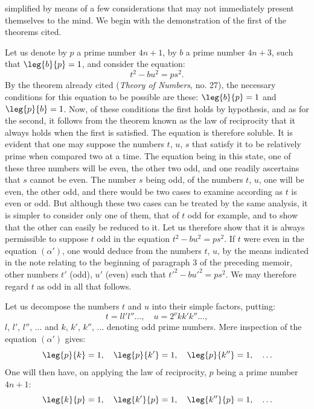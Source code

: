 \noindent
simplified by means of a few considerations that may not immediately
present themselves to the mind. We begin with the demonstration of the first
of the theorems cited.
\par\indent
Let us denote by $p$ a prime number $4n+1$, by $b$ a prime number
$4n+3$, such that $\leg{b}{p}=1$, and consider the equation:
\begin{equation*}\tag{$\alpha'$}
t^2-bu^2=ps^2.
\end{equation*}
By the theorem already cited (\emph{Theory of Numbers}, no. 27), the necessary
conditions for this equation to be possible are these: $\leg{b}{p}=1$ and
$\leg{p}{b}=1$. Now, of these conditions the first holds by hypothesis, and as
for the second, it follows from the theorem known as the law of reciprocity
that it always holds when the first is satisfied. The equation is therefore
soluble. It is evident that one may suppose the numbers $t$, $u$, $s$ that
satisfy it to be relatively prime when compared two at a time. The equation being
in this state, one of these three numbers will be even, the other two odd, and
one readily ascertains that $s$ cannot be even. The number $s$ being odd,
of the numbers $t$, $u$, one will be even, the other odd, and there would be two cases to
examine according as $t$ is even or odd. But although these two cases can
be treated by the same analysis, it is simpler to consider only
one of them, that of $t$ odd for example, and to show that the other
can easily be reduced to it. Let us therefore show that it is always permissible to
suppose $t$ odd in the equation $t^2-bu^2=ps^2$. If $t$ were even in
the equation $(\alpha')$, one would deduce from the numbers $t$, $u$, by the means indicated in the note
relating to the beginning of paragraph 3 of the preceding memoir, other
numbers $t'$ (odd), $u'$ (even) such that $t'^2-bu'^2=ps^2$. We may therefore
regard $t$ as odd in all that follows.
\par\indent
Let us decompose the numbers $t$ and $u$ into their simple factors, putting:
\[
t=ll'l''\ldots,\quad u=2^\nu kk'k''\ldots,
\]
$l$, $l'$, $l''$, $\ldots$ and $k$, $k'$, $k''$, $\ldots$ denoting odd prime numbers. Mere
inspection of the equation $(\alpha')$ gives:
\[
\leg{p}{k}=1,\quad\leg{p}{k'}=1,\quad\leg{p}{k''}=1,\quad\ldots
\]
One will then have, on applying the law of reciprocity, $p$ being a prime
number $4n+1$:
\[
\leg{k}{p}=1,\quad\leg{k'}{p}=1,\quad\leg{k''}{p}=1,\quad\ldots
\]
